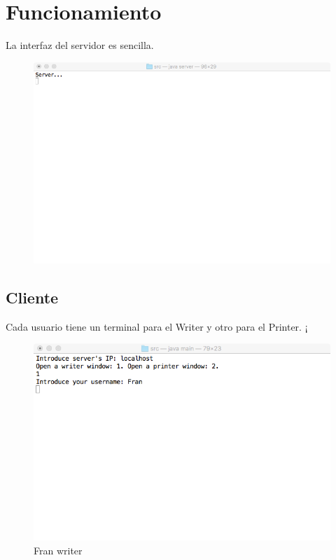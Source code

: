 \section{Funcionamiento}
La interfaz del servidor es sencilla.

\begin{figure}[H]
	\includegraphics[scale=0.55]{./Imagenes/server1.png}
\end{figure}





\subsection{Cliente}
Cada usuario tiene un terminal para el Writer y otro para el Printer.
¡
\begin{figure}[H]
	\includegraphics[scale=0.55]{./Imagenes/franwriter1.png}
	\caption{Fran writer}
\end{figure}

